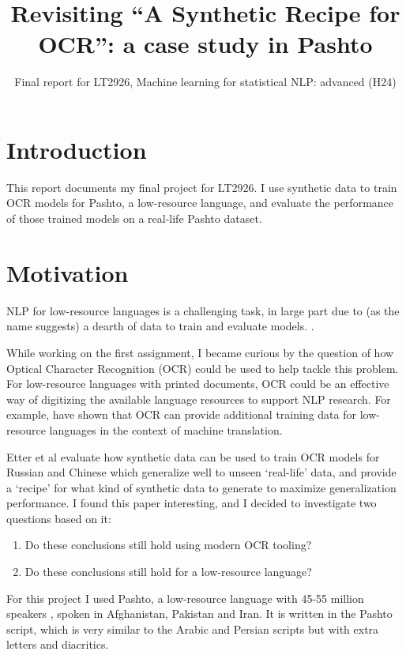 \documentclass[twocolumn,11pt]{extarticle}
\title{\vspace{-2cm}Revisiting ``A Synthetic Recipe for OCR'': a case study in Pashto}
\author{Final report for LT2926,  Machine learning for statistical NLP: advanced (H24)}
\date{}
\begin{document}
\maketitle

\section{Introduction}  

This report documents my final project for LT2926. I use synthetic data to train OCR models for Pashto, a low-resource language, and evaluate the performance of those trained models on a real-life Pashto dataset. 

\section{Motivation}

NLP for low-resource languages is a challenging task, in large part due to (as the name suggests) a dearth of data to train and evaluate models. \cite{magueresse_low-resource_2020}.

While working on the first assignment, I became curious by the question of how Optical Character Recognition (OCR) could be used to help tackle this problem. For low-resource languages with printed documents, OCR could be an effective way of digitizing the available language resources to support NLP research. For example, \cite{ignat_ocr_2022} have shown that OCR can provide additional training data for low-resource languages in the context of machine translation. 

Etter et al \cite{etter_synthetic_2019} evaluate how synthetic data can be used to train OCR models for Russian and Chinese which generalize well to unseen `real-life' data, and provide a `recipe' for what kind of synthetic data to generate to maximize generalization performance. I found this paper interesting, and I decided to investigate two questions based on it:
\begin{enumerate}
    \item Do these conclusions still hold using modern OCR tooling?
    \item Do these conclusions still hold for a low-resource language?
\end{enumerate}

For this project I used Pashto, a low-resource language with 45-55 million speakers \cite{noauthor_pashto_nodate}, spoken in Afghanistan, Pakistan and Iran. It is written in the Pashto script, which is very similar to the Arabic and Persian scripts but with extra letters and diacritics. 
\end{document}
